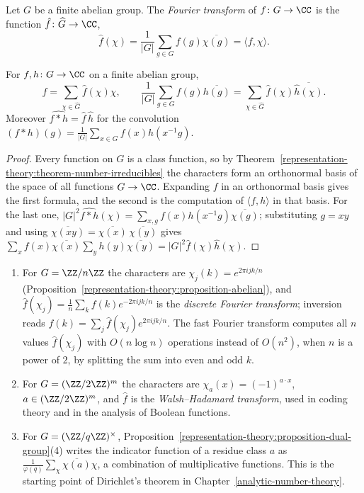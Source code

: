 \begin{definition}\label{representation-theory:definition-finite-fourier}
Let $G$ be a finite abelian group. The \emph{Fourier transform} of $f \colon G \to \CC$ is the function $\hat f \colon \widehat G \to \CC$,
\[
\hat f(\chi) = \frac{1}{|G|}\sum_{g \in G}f(g)\overline{\chi(g)} = \langle f, \chi\rangle .
\]
\end{definition}

\begin{theorem}\label{representation-theory:theorem-finite-fourier}
For $f, h \colon G \to \CC$ on a finite abelian group,
\[
f = \sum_{\chi \in \widehat G}\hat f(\chi)\chi, \qquad \frac{1}{|G|}\sum_{g \in G}f(g)\overline{h(g)} = \sum_{\chi \in \widehat G}\hat f(\chi)\overline{\hat h(\chi)} .
\]
Moreover $\widehat{f * h} = \hat f\,\hat h$ for the convolution $(f * h)(g) = \frac{1}{|G|}\sum_{x \in G}f(x)h(x^{-1}g)$.
\end{theorem}

\begin{proof}
Every function on $G$ is a class function, so by Theorem~\ref{representation-theory:theorem-number-irreducibles} the characters form an orthonormal basis of the space of all functions
$G \to \CC$. Expanding $f$ in an orthonormal basis gives the first formula, and the second is the computation of $\langle f, h\rangle$ in that basis. For the last one,
$|G|^2\widehat{f * h}(\chi) = \sum_{x, g}f(x)h(x^{-1}g)\overline{\chi(g)}$; substituting $g = xy$ and using $\overline{\chi(xy)} = \overline{\chi(x)}\,\overline{\chi(y)}$ gives
$\sum_xf(x)\overline{\chi(x)}\sum_yh(y)\overline{\chi(y)} = |G|^2\hat f(\chi)\hat h(\chi)$.
\end{proof}

\begin{example}\label{representation-theory:example-finite-fourier}
\begin{enumerate}
\item For $G = \ZZ/n\ZZ$ the characters are $\chi_j(k) = e^{2\pi ijk/n}$ (Proposition~\ref{representation-theory:proposition-abelian}), and $\hat f(\chi_j) = \frac1n\sum_kf(k)e^{-2\pi ijk/n}$ is the
\emph{discrete Fourier transform}; inversion reads $f(k) = \sum_j\hat f(\chi_j)e^{2\pi ijk/n}$. The fast Fourier transform computes all $n$ values $\hat f(\chi_j)$ with $O(n\log n)$ operations
instead of $O(n^2)$, when $n$ is a power of $2$, by splitting the sum into even and odd $k$.
\item For $G = (\ZZ/2\ZZ)^m$ the characters are $\chi_a(x) = (-1)^{a \cdot x}$, $a \in (\ZZ/2\ZZ)^m$, and $\hat f$ is the \emph{Walsh--Hadamard transform}, used in coding theory and in the analysis of Boolean
functions.
\item For $G = (\ZZ/q\ZZ)^\times$, Proposition~\ref{representation-theory:proposition-dual-group}(4) writes the indicator function of a residue class $a$ as
$\frac{1}{\varphi(q)}\sum_\chi\overline{\chi(a)}\chi$, a combination of multiplicative functions. This is the starting point of Dirichlet's theorem in Chapter~\ref{analytic-number-theory}.
\end{enumerate}
\end{example}

